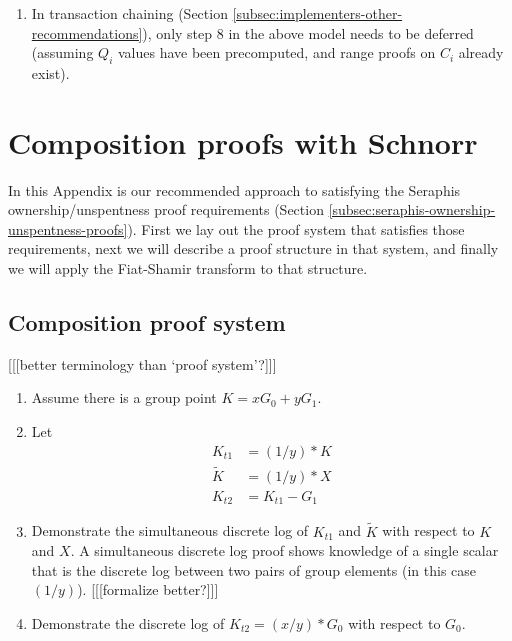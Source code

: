 \begin{appendices}
\begin{enumerate}
    \item In transaction chaining (Section \ref{subsec:implementers-other-recommendations}), only step 8 in the above model needs to be deferred (assuming $Q_i$ values have been precomputed, and range proofs on $C_i$ already exist).
\end{enumerate}



\section{Composition proofs with Schnorr}
\label{appendix:composition-with-schnorr}

In this Appendix is our recommended approach to satisfying the Seraphis ownership/unspentness proof requirements (Section \ref{subsec:seraphis-ownership-unspentness-proofs}). First we lay out the proof system that satisfies those requirements, next we will describe a proof structure in that system, and finally we will apply the Fiat-Shamir transform \cite{fiat-shamir-transform} to that structure.


\subsection{Composition proof system}
\label{appendix:composition-proof-system}

[[[better terminology than `proof system'?]]]

\begin{enumerate}
    \item Assume there is a group point $K = x G_0 + y G_1$.

    \item Let\vspace{.115cm}
    \begin{align*}
        K_{t1} &= (1/y)*K \\
        \tilde{K} &= (1/y)*X \\
        K_{t2} &= K_{t1} - G_1
    \end{align*}

    \item Demonstrate the simultaneous discrete log of $K_{t1}$ and $\tilde{K}$ with respect to $K$ and $X$. A simultaneous discrete log proof shows knowledge of a single scalar that is the discrete log between two pairs of group elements (in this case $(1/y)$). [[[formalize better?]]]

    \item Demonstrate the discrete log of $K_{t2} = (x/y)*G_0$ with respect to $G_0$.
\end{enumerate}


\end{appendices}
